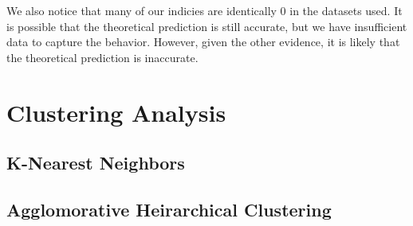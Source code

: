\documentclass{article}
\begin{document}
We also notice that many of our indicies are identically 0 in the datasets used. It is possible that the theoretical prediction is still accurate, but we have insufficient data to capture the behavior.
However, given the other evidence, it is likely that the theoretical prediction is inaccurate.



\section{Clustering Analysis}

\subsection{K-Nearest Neighbors}

\subsection{Agglomorative Heirarchical Clustering}
\end{document}
